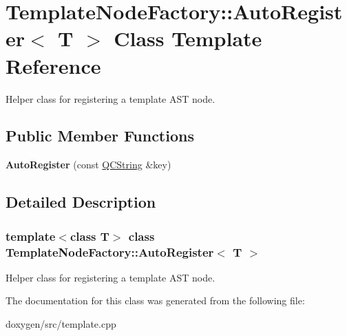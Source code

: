 \hypertarget{class_template_node_factory_1_1_auto_register}{}\section{Template\+Node\+Factory\+::Auto\+Register$<$ T $>$ Class Template Reference}
\label{class_template_node_factory_1_1_auto_register}


Helper class for registering a template A\+ST node.  


\subsection*{Public Member Functions}
\begin{DoxyCompactItemize}
\item 
\mbox{\label{class_template_node_factory_1_1_auto_register_a59fddb4ad7781a386549d9b4f718fe45}} 
{\bfseries Auto\+Register} (const \mbox{\hyperlink{class_q_c_string}{Q\+C\+String}} \&key)
\end{DoxyCompactItemize}


\subsection{Detailed Description}
\subsubsection*{template$<$class T$>$\newline
class Template\+Node\+Factory\+::\+Auto\+Register$<$ T $>$}

Helper class for registering a template A\+ST node. 

The documentation for this class was generated from the following file\+:\begin{DoxyCompactItemize}
\item 
doxygen/src/template.\+cpp\end{DoxyCompactItemize}
